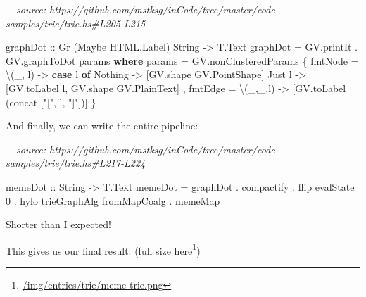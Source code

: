 \documentclass[]{article}
\newenvironment{Shaded}{}{}
\newcommand{\CommentTok}[1]{\textcolor[rgb]{0.38,0.63,0.69}{\textit{#1}}}
\newcommand{\DataTypeTok}[1]{\textcolor[rgb]{0.56,0.13,0.00}{#1}}
\newcommand{\DecValTok}[1]{\textcolor[rgb]{0.25,0.63,0.44}{#1}}
\newcommand{\FunctionTok}[1]{\textcolor[rgb]{0.02,0.16,0.49}{#1}}
\newcommand{\KeywordTok}[1]{\textcolor[rgb]{0.00,0.44,0.13}{\textbf{#1}}}
\newcommand{\NormalTok}[1]{#1}
\newcommand{\OperatorTok}[1]{\textcolor[rgb]{0.40,0.40,0.40}{#1}}
\newcommand{\OtherTok}[1]{\textcolor[rgb]{0.00,0.44,0.13}{#1}}
\newcommand{\StringTok}[1]{\textcolor[rgb]{0.25,0.44,0.63}{#1}}
\renewcommand{\href}[2]{#2\footnote{\url{#1}}}
\begin{document}
\begin{Shaded}
\begin{Highlighting}[]
\CommentTok{{-}{-} source: https://github.com/mstksg/inCode/tree/master/code{-}samples/trie/trie.hs\#L205{-}L215}

\NormalTok{graphDot}
\OtherTok{    ::} \DataTypeTok{Gr}\NormalTok{ (}\DataTypeTok{Maybe} \DataTypeTok{HTML.Label}\NormalTok{) }\DataTypeTok{String}
    \OtherTok{{-}\textgreater{}} \DataTypeTok{T.Text}
\NormalTok{graphDot }\OtherTok{=}\NormalTok{ GV.printIt }\OperatorTok{.}\NormalTok{ GV.graphToDot params}
  \KeywordTok{where}
\NormalTok{    params }\OtherTok{=}\NormalTok{ GV.nonClusteredParams}
\NormalTok{      \{ fmtNode }\OtherTok{=}\NormalTok{ \textbackslash{}(\_,  l) }\OtherTok{{-}\textgreater{}} \KeywordTok{case}\NormalTok{ l }\KeywordTok{of}
          \DataTypeTok{Nothing} \OtherTok{{-}\textgreater{}}\NormalTok{ [GV.shape }\DataTypeTok{GV.PointShape}\NormalTok{]}
          \DataTypeTok{Just}\NormalTok{ l\textquotesingle{} }\OtherTok{{-}\textgreater{}}\NormalTok{ [GV.toLabel l\textquotesingle{}, GV.shape }\DataTypeTok{GV.PlainText}\NormalTok{]}
\NormalTok{      , fmtEdge }\OtherTok{=}\NormalTok{ \textbackslash{}(\_,\_,l) }\OtherTok{{-}\textgreater{}}\NormalTok{ [GV.toLabel (}\FunctionTok{concat}\NormalTok{ [}\StringTok{"["}\NormalTok{, l, }\StringTok{"]"}\NormalTok{])]}
\NormalTok{      \}}
\end{Highlighting}
\end{Shaded}

And finally, we can write the entire pipeline:

\begin{Shaded}
\begin{Highlighting}[]
\CommentTok{{-}{-} source: https://github.com/mstksg/inCode/tree/master/code{-}samples/trie/trie.hs\#L217{-}L224}

\NormalTok{memeDot}
\OtherTok{    ::} \DataTypeTok{String}
    \OtherTok{{-}\textgreater{}} \DataTypeTok{T.Text}
\NormalTok{memeDot }\OtherTok{=}\NormalTok{ graphDot}
        \OperatorTok{.}\NormalTok{ compactify}
        \OperatorTok{.} \FunctionTok{flip}\NormalTok{ evalState }\DecValTok{0}
        \OperatorTok{.}\NormalTok{ hylo trieGraphAlg fromMapCoalg}
        \OperatorTok{.}\NormalTok{ memeMap}
\end{Highlighting}
\end{Shaded}

Shorter than I expected!

This gives us our final result: (\href{/img/entries/trie/meme-trie.png}{full
size here})
\end{document}
